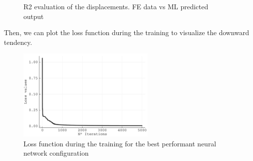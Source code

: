 \begin{figure}
  \centering
  \caption{R2 evaluation of the displacements. FE data vs ML predicted output}
\end{figure}



Then, we can plot the loss function during the training to visualize the downward tendency.

\begin{figure}
  \begin{center}
    \includegraphics[width=0.6\textwidth]{Figures/NeuralNetworkStudy/Loss_1.pdf}
  \end{center}
  \caption{Loss function during the training for the best performant neural network configuration}\label{fig:}
\end{figure}


